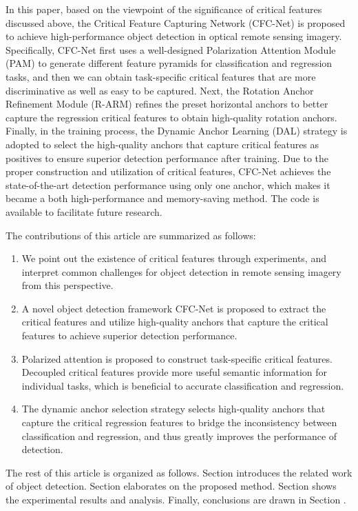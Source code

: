 \documentclass[journal]{IEEEtran}
\begin{document}
In this paper, based on the viewpoint of the significance of critical features discussed above, the Critical Feature Capturing Network (CFC-Net) is proposed to achieve high-performance object detection in optical remote sensing imagery. Specifically, CFC-Net first uses a well-designed Polarization Attention Module (PAM) to generate different feature pyramids for classification and regression tasks, and then we can obtain task-specific critical features that are more discriminative as well as easy to be captured. Next, the Rotation Anchor Refinement Module (R-ARM) refines the preset horizontal anchors to better capture the regression critical features to obtain high-quality rotation anchors. Finally, in the training process, the Dynamic Anchor Learning (DAL) strategy is adopted to select the high-quality anchors that capture critical features as positives to ensure superior detection performance after training. Due to the proper construction and utilization of critical features, CFC-Net achieves the state-of-the-art detection performance using only one anchor, which makes it became a both high-performance and memory-saving method. The code is available to facilitate future research.

The contributions of this article are summarized as follows:
\begin{enumerate}
\item We point out the existence of critical features through experiments, and interpret common challenges for object detection in remote sensing imagery from this perspective.
\item A novel object detection framework CFC-Net is proposed to extract the critical features and utilize high-quality anchors that capture the critical features to achieve superior detection performance. 
\item Polarized attention is proposed to construct task-specific critical features. Decoupled critical features provide more useful semantic information for individual tasks, which is beneficial to accurate classification and regression.
\item The dynamic anchor selection strategy selects high-quality anchors that capture the critical regression features to bridge the inconsistency between classification and regression, and thus greatly improves the performance of detection.
\end{enumerate}

The rest of this article is organized as follows. Section \uppercase\expandafter{} introduces the related work of object detection. Section \uppercase\expandafter{} elaborates on the proposed method. Section \uppercase\expandafter{} shows the experimental results and analysis. Finally, conclusions are drawn in Section \uppercase\expandafter{}.
\end{document}
